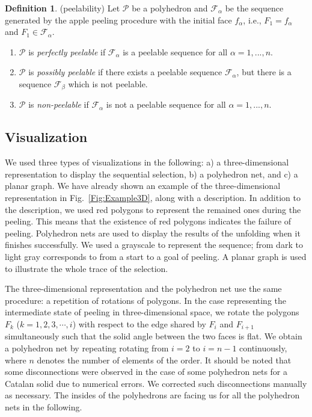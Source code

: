 \documentclass[]{interact}
\theoremstyle{plain}%
\theoremstyle{definition}
\newtheorem{definition}[theorem]{Definition}
\theoremstyle{remark}
\begin{document}
\begin{definition} (peelability)
Let $\mathcal{P}$ be a polyhedron and $\mathcal{F}_{\alpha}$ be the sequence generated by the apple peeling procedure with the initial face $f_{\alpha}$, i.e., $F_1 = f_{\alpha}$ and $F_1\in \mathcal{F}_{\alpha}$. 
\begin{enumerate}
    \item $\mathcal{P}$ is \textit{perfectly peelable} if $\mathcal{F}_{\alpha}$ is a peelable sequence for all $\alpha=1, ..., n$.
    \item $\mathcal{P}$ is \textit{possibly peelable} if there exists a peelable sequence $\mathcal{F}_{\alpha}$, but there is a sequence $\mathcal{F}_{\beta}$ which is not peelable. 
    \item $\mathcal{P}$ is \textit{non-peelable} if $\mathcal{F}_{\alpha}$ is not a peelable sequence for all $\alpha=1, ..., n$.

\end{enumerate}
\end{definition}


\subsection{Visualization}

We used three types of visualizations in the following: a) a three-dimensional representation to display the sequential selection, b)
a polyhedron net, and c) a planar graph. We have already shown an example
of the three-dimensional representation in Fig.~\ref{Fig:Example3D}, along with a description.
In addition to the description, we used red polygons to represent the
remained ones during the peeling. This means that the existence of red polygons indicates the failure of peeling. Polyhedron nets are used to display the results of the unfolding when it finishes successfully. We used a grayscale to represent the sequence; from dark to light gray corresponds to from a start to a goal of peeling. A planar graph is used to illustrate the whole trace of the selection. 

The three-dimensional representation and the polyhedron net use the same
procedure: a repetition of rotations of polygons. In the case representing the intermediate state of peeling in three-dimensional space, we rotate the polygons
\(F_k\) (\(k=1, 2, 3, \cdots , i\)) with respect to the edge shared by \(F_i\) and \(F_{i+1}\) simultaneously such that the solid angle between the two faces is flat. We obtain a polyhedron net by repeating rotating from \(i=2\) to \(i=n-1\) continuously, where $n$ denotes the number of elements of the order.
It should be noted that some disconnections were observed in the case of some polyhedron nets for
a Catalan solid due to numerical errors. We corrected such disconnections
manually as necessary. The insides of the polyhedrons are facing us for all the polyhedron nets in the following.
\end{document}
